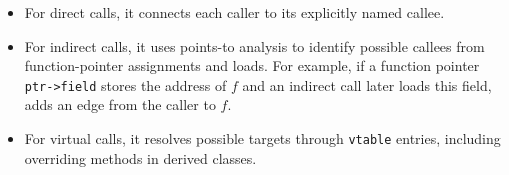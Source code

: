 \begin{itemize}
    \setlength\itemsep{0.3em}
    \item For direct calls, it connects each caller to its explicitly named callee.
    
    \item For indirect calls, it uses points-to analysis to identify possible callees from function-pointer assignments and loads. For example, if a function pointer \texttt{ptr->field} stores the address of $f$ and an indirect call later loads this field, \sys adds an edge from the caller to $f$. 

    \item For virtual calls, it resolves possible targets through \texttt{vtable} entries, including overriding methods in derived classes.
\end{itemize}

